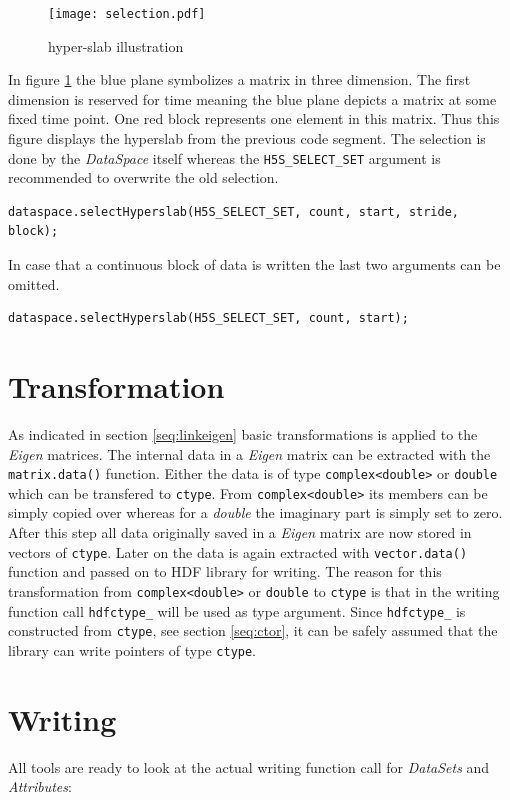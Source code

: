 \begin{figure}[ht!]
\centering
\texttt{[image: selection.pdf]}
\caption{hyper-slab illustration}
\label{fig:hyperslab}
\end{figure}
In figure \ref{fig:hyperslab} the blue plane symbolizes a matrix in three dimension. The first dimension is reserved for time meaning the blue plane depicts a matrix at some fixed time point. One red block represents one element in this matrix. Thus this figure displays the hyperslab from the previous code segment. The selection is done by the \textit{DataSpace} itself whereas the \texttt{H5S\_SELECT\_SET} argument is recommended to overwrite the old selection.
\begin{lstlisting}
dataspace.selectHyperslab(H5S_SELECT_SET, count, start, stride, block);
\end{lstlisting}
In case that a continuous block of data is written the last two arguments can be omitted.
\begin{lstlisting}
dataspace.selectHyperslab(H5S_SELECT_SET, count, start);
\end{lstlisting}


\section{Transformation}
\label{seq:transform}
As indicated in section \ref{seq:linkeigen} basic transformations is applied to the \textit{Eigen} matrices. The internal data in a \textit{Eigen} matrix can be extracted with the \texttt{matrix.data()} function. Either the data is of type \texttt{complex<double>} or \texttt{double} which can be transfered to \texttt{ctype}. From \texttt{complex<double>} its members can be simply copied over whereas for a \textit{double} the imaginary part is simply set to zero. After this step all data originally saved in a \textit{Eigen} matrix are now stored in vectors of \texttt{ctype}. Later on the data is again extracted with \texttt{vector.data()} function and passed on to HDF library for writing. The reason for this transformation from \texttt{complex<double>} or \texttt{double} to \texttt{ctype} is that in the writing function call \texttt{hdfctype\_} will be used as type argument. Since \texttt{hdfctype\_} is constructed from \texttt{ctype}, see section \ref{seq:ctor}, it can be safely assumed that the library can write pointers of type \texttt{ctype}.

\section{Writing}
\label{seq:writing}
All tools are ready to look at the actual writing function call for \textit{DataSets} and \textit{Attributes}:
 
